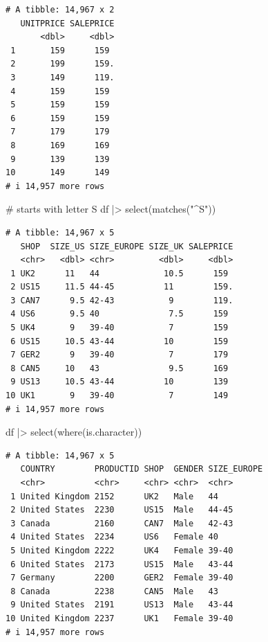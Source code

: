 \documentclass[
  letterpaper,
  DIV=11,
  numbers=noendperiod]{scrreprt}
\newenvironment{Shaded}{\begin{snugshade}}{\end{snugshade}}
\newcommand{\CommentTok}[1]{\textcolor[rgb]{0.37,0.37,0.37}{#1}}
\newcommand{\FunctionTok}[1]{\textcolor[rgb]{0.28,0.35,0.67}{#1}}
\newcommand{\NormalTok}[1]{\textcolor[rgb]{0.00,0.23,0.31}{#1}}
\newcommand{\SpecialCharTok}[1]{\textcolor[rgb]{0.37,0.37,0.37}{#1}}
\newcommand{\StringTok}[1]{\textcolor[rgb]{0.13,0.47,0.30}{#1}}
\begin{document}
\begin{Shaded}
\end{Shaded}

\begin{verbatim}
# A tibble: 14,967 x 2
   UNITPRICE SALEPRICE
       <dbl>     <dbl>
 1       159      159 
 2       199      159.
 3       149      119.
 4       159      159 
 5       159      159 
 6       159      159 
 7       179      179 
 8       169      169 
 9       139      139 
10       149      149 
# i 14,957 more rows
\end{verbatim}

\begin{Shaded}
\begin{Highlighting}[]
\CommentTok{\# starts with letter S}
\NormalTok{df }\SpecialCharTok{|\textgreater{}}
    \FunctionTok{select}\NormalTok{(}\FunctionTok{matches}\NormalTok{(}\StringTok{"\^{}S"}\NormalTok{))}
\end{Highlighting}
\end{Shaded}

\begin{verbatim}
# A tibble: 14,967 x 5
   SHOP  SIZE_US SIZE_EUROPE SIZE_UK SALEPRICE
   <chr>   <dbl> <chr>         <dbl>     <dbl>
 1 UK2      11   44             10.5      159 
 2 US15     11.5 44-45          11        159.
 3 CAN7      9.5 42-43           9        119.
 4 US6       9.5 40              7.5      159 
 5 UK4       9   39-40           7        159 
 6 US15     10.5 43-44          10        159 
 7 GER2      9   39-40           7        179 
 8 CAN5     10   43              9.5      169 
 9 US13     10.5 43-44          10        139 
10 UK1       9   39-40           7        149 
# i 14,957 more rows
\end{verbatim}

\begin{Shaded}
\begin{Highlighting}[]
\NormalTok{df }\SpecialCharTok{|\textgreater{}}
    \FunctionTok{select}\NormalTok{(}\FunctionTok{where}\NormalTok{(is.character))}
\end{Highlighting}
\end{Shaded}

\begin{verbatim}
# A tibble: 14,967 x 5
   COUNTRY        PRODUCTID SHOP  GENDER SIZE_EUROPE
   <chr>          <chr>     <chr> <chr>  <chr>      
 1 United Kingdom 2152      UK2   Male   44         
 2 United States  2230      US15  Male   44-45      
 3 Canada         2160      CAN7  Male   42-43      
 4 United States  2234      US6   Female 40         
 5 United Kingdom 2222      UK4   Female 39-40      
 6 United States  2173      US15  Male   43-44      
 7 Germany        2200      GER2  Female 39-40      
 8 Canada         2238      CAN5  Male   43         
 9 United States  2191      US13  Male   43-44      
10 United Kingdom 2237      UK1   Female 39-40      
# i 14,957 more rows
\end{verbatim}
\end{document}
